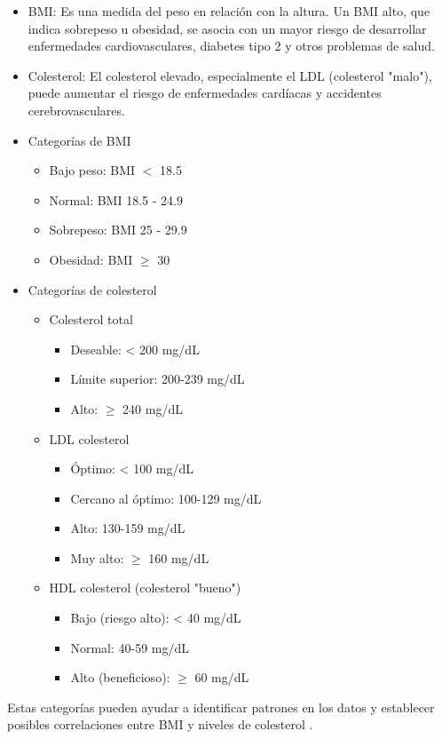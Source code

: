 \documentclass[10pt,journal,compsoc]{IEEEtran}
\begin{document}
\begin{itemize}
  \item BMI: Es una medida del peso en relación con la altura. Un BMI alto, que indica sobrepeso u obesidad, se asocia con un mayor riesgo de desarrollar enfermedades cardiovasculares, diabetes tipo 2 y otros problemas de salud.
  \item Colesterol: El colesterol elevado, especialmente el LDL (colesterol "malo"), puede aumentar el riesgo de enfermedades cardíacas y accidentes cerebrovasculares.

  \item Categorías de BMI
        \begin{itemize}
          \item Bajo peso: BMI $<$ 18.5
          \item Normal: BMI 18.5 - 24.9
          \item Sobrepeso: BMI 25 - 29.9
          \item Obesidad: BMI $\geq$ 30
        \end{itemize}
  \item Categorías de colesterol
            \begin{itemize}
              \item Colesterol total
                    \begin{itemize}
                      \item Deseable: < 200 mg/dL
                      \item Límite superior: 200-239 mg/dL
                      \item Alto: $ \geq $ 240 mg/dL
                    \end{itemize}
              \item LDL colesterol
                    \begin{itemize}
                      \item Óptimo: < 100 mg/dL
                      \item Cercano al óptimo: 100-129 mg/dL
                      \item Alto: 130-159 mg/dL
                      \item Muy alto: $ \geq $  160 mg/dL
                    \end{itemize}
              \item HDL colesterol (colesterol "bueno")
                    \begin{itemize}
                      \item Bajo (riesgo alto): < 40 mg/dL
                      \item Normal: 40-59 mg/dL
                      \item Alto (beneficioso): $ \geq $ 60 mg/dL
                    \end{itemize}
            \end{itemize}
\end{itemize}
Estas categorías pueden ayudar a identificar patrones en los datos y establecer posibles correlaciones entre BMI y niveles de colesterol \cite{aha_colesterol}\cite{cdc_bmi}\cite{nih_bmi_colesterol}.
\end{document}
